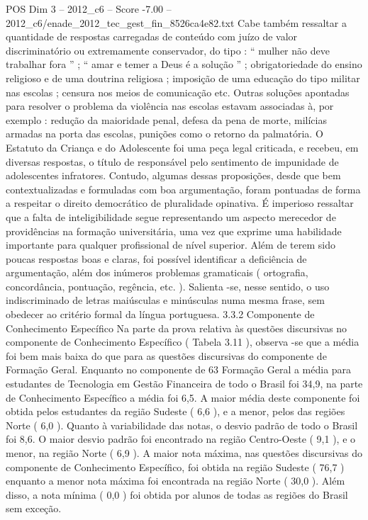 \begin{textsample}{POS Dim 3 – 2012\_c6 – Score -7.00 – 2012\_c6/enade\_2012\_tec\_gest\_fin\_8526ca4e82.txt}
Cabe também ressaltar a quantidade de respostas carregadas de conteúdo com juízo de valor discriminatório ou extremamente conservador, do tipo : “ mulher não deve trabalhar fora ” ; “ amar e temer a Deus é a solução ” ; obrigatoriedade do ensino religioso e de uma doutrina religiosa ; imposição de uma educação do tipo militar nas escolas ; censura nos meios de comunicação etc.
Outras soluções apontadas para resolver o problema da violência nas escolas estavam associadas à, por exemplo : redução da maioridade penal, defesa da pena de morte, milícias armadas na porta das escolas, punições como o retorno da palmatória.
O Estatuto da Criança e do Adolescente foi uma peça legal criticada, e recebeu, em diversas respostas, o título de responsável pelo sentimento de impunidade de adolescentes infratores.
Contudo, algumas dessas proposições, desde que bem contextualizadas e formuladas com boa argumentação, foram pontuadas de forma a respeitar o direito democrático de pluralidade opinativa.
É imperioso ressaltar que a falta de inteligibilidade segue representando um aspecto merecedor de providências na formação universitária, uma vez que exprime uma habilidade importante para qualquer profissional de nível superior.
Além de terem sido poucas respostas boas e claras, foi possível identificar a deficiência de argumentação, além dos inúmeros problemas gramaticais ( ortografia, concordância, pontuação, regência, etc. ).
Salienta -se, nesse sentido, o uso indiscriminado de letras maiúsculas e minúsculas numa mesma frase, sem obedecer ao critério formal da língua portuguesa. 3.3.2 Componente de Conhecimento Específico Na parte da prova relativa às questões discursivas no componente de Conhecimento Específico ( Tabela 3.11 ), observa -se que a média foi bem mais baixa do que para as questões discursivas do componente de Formação Geral.
Enquanto no componente de 63 Formação Geral a média para estudantes de Tecnologia em Gestão Financeira de todo o Brasil foi 34,9, na parte de Conhecimento Específico a média foi 6,5.
A maior média deste componente foi obtida pelos estudantes da região Sudeste ( 6,6 ), e a menor, pelos das regiões Norte ( 6,0 ).
Quanto à variabilidade das notas, o desvio padrão de todo o Brasil foi 8,6.
O maior desvio padrão foi encontrado na região Centro-Oeste ( 9,1 ), e o menor, na região Norte ( 6,9 ).
A maior nota máxima, nas questões discursivas do componente de Conhecimento Específico, foi obtida na região Sudeste ( 76,7 ) enquanto a menor nota máxima foi encontrada na região Norte ( 30,0 ).
Além disso, a nota mínima ( 0,0 ) foi obtida por alunos de todas as regiões do Brasil sem exceção.

\end{textsample}
